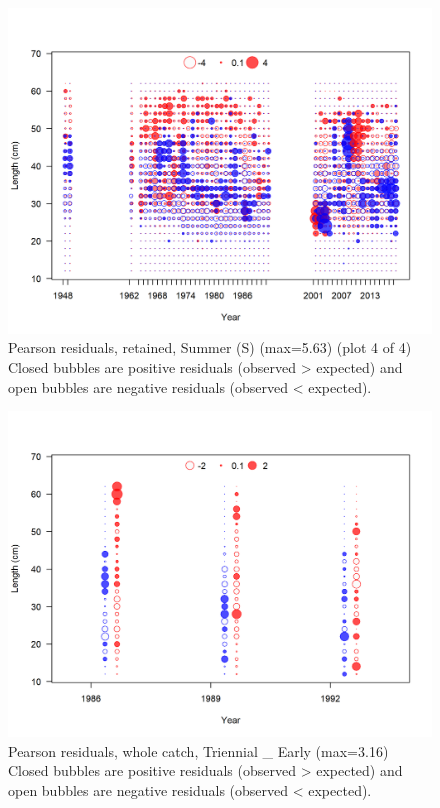 \documentclass[12pt,]{article}
\begin{document}
\begin{figure}
\centering
\includegraphics{r4ss/plots_mod1/comp_lenfit_residsflt4mkt2_page4.png}
\caption{Pearson residuals, retained, Summer (S) (max=5.63) (plot 4 of
4)\\
Closed bubbles are positive residuals (observed \textgreater{} expected)
and open bubbles are negative residuals (observed \textless{} expected).
\label{fig:ss_len_pearson}}
\end{figure}

\begin{figure}
\centering
\includegraphics{r4ss/plots_mod1/comp_lenfit_residsflt5mkt0.png}
\caption{Pearson residuals, whole catch, Triennial \_ Early (max=3.16)\\
Closed bubbles are positive residuals (observed \textgreater{} expected)
and open bubbles are negative residuals (observed \textless{} expected).
\label{fig:tri_early_len_pearson}}
\end{figure}
\end{document}
